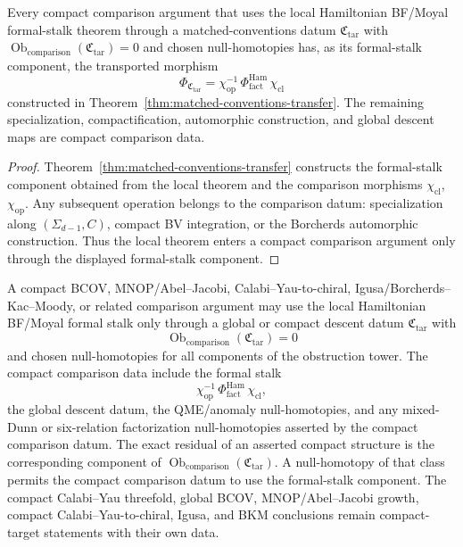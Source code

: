 \begin{cor}\label{cor:matched-conventions-factorization}
  Every compact comparison argument that uses the local Hamiltonian BF/Moyal
  formal-stalk theorem through a matched-conventions datum
  \(\mathfrak C_{\mathrm{tar}}\)
  with \(\operatorname{Ob}_{\mathrm{comparison}}(\mathfrak C_{\mathrm{tar}})=0\) and
  chosen null-homotopies has, as its formal-stalk component, the transported
  morphism
  \[
    \Phi_{\mathfrak C_{\mathrm{tar}}}=
    \chi_{\mathrm{op}}^{-1}\,
    \Phi^{\mathrm{Ham}}_{\mathrm{fact}}\,
    \chi_{\mathrm{cl}}
  \]
  constructed in Theorem~\ref{thm:matched-conventions-transfer}.  The remaining
  specialization, compactification, automorphic construction, and global
  descent maps are compact comparison data.
\end{cor}

\begin{proof}
  Theorem~\ref{thm:matched-conventions-transfer} constructs the formal-stalk
  component obtained from the local theorem and the comparison morphisms
  \(\chi_{\mathrm{cl}}\), \(\chi_{\mathrm{op}}\).  Any subsequent operation
  belongs to the comparison datum: specialization along \((\Sigma_{d-1},C)\),
  compact BV integration, or the Borcherds automorphic construction.  Thus the
  local theorem enters a compact comparison argument only through the
  displayed formal-stalk component.
\end{proof}

\begin{cor}\label{cor:target-obstruction-criterion}
  A compact BCOV, MNOP/Abel--Jacobi, Calabi--Yau-to-chiral,
  Igusa/Borcherds--Kac--Moody, or related comparison argument may use
  the local Hamiltonian BF/Moyal formal stalk only through a global or
  compact descent datum
  \(\mathfrak C_{\mathrm{tar}}\) with
  \[
    \operatorname{Ob}_{\mathrm{comparison}}(\mathfrak C_{\mathrm{tar}})=0
  \]
  and chosen null-homotopies for all components of the obstruction tower.
  The compact comparison data include the formal stalk
  \[
    \chi_{\mathrm{op}}^{-1}\,
    \Phi^{\mathrm{Ham}}_{\mathrm{fact}}\,
    \chi_{\mathrm{cl}},
  \]
  the global descent datum, the QME/anomaly null-homotopies, and any
  mixed-Dunn or six-relation factorization null-homotopies asserted by
  the compact comparison datum.  The exact residual of an asserted compact
  structure is the corresponding component of
  \(\operatorname{Ob}_{\mathrm{comparison}}(\mathfrak C_{\mathrm{tar}})\).  A
  null-homotopy of that class permits the compact comparison datum to
  use the formal-stalk component.  The compact Calabi--Yau threefold,
  global BCOV,
  MNOP/Abel--Jacobi growth, compact Calabi--Yau-to-chiral, Igusa, and BKM
  conclusions remain compact-target statements with their own data.
\end{cor}

